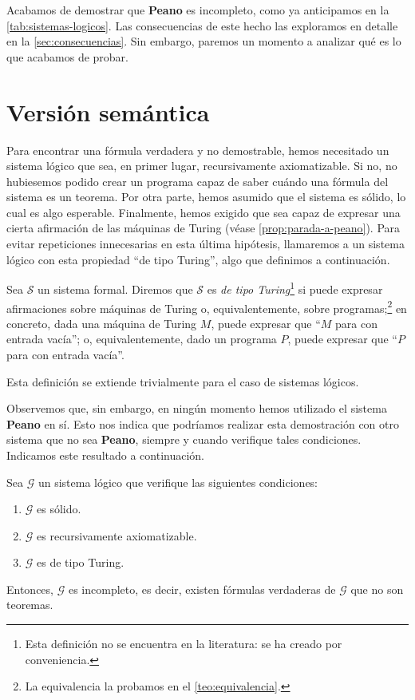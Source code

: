 Acabamos de demostrar que \textbf{Peano} es incompleto, como ya anticipamos en la \cref{tab:sistemas-logicos}. Las consecuencias de este hecho las exploramos en detalle en la \cref{sec:consecuencias}. Sin embargo, paremos un momento a analizar qué es lo que acabamos de probar.

\section{Versión semántica}\label{sec:version-semantica}

Para encontrar una fórmula verdadera y no demostrable, hemos necesitado un sistema lógico que sea, en primer lugar, recursivamente axiomatizable. Si no, no hubiesemos podido crear un programa capaz de saber cuándo una fórmula del sistema es un teorema. Por otra parte, hemos asumido que el sistema es sólido, lo cual es algo esperable. Finalmente, hemos exigido que sea capaz de expresar una cierta afirmación de las máquinas de Turing (véase \cref{prop:parada-a-peano}). Para evitar repeticiones innecesarias en esta última hipótesis, llamaremos a un sistema lógico con esta propiedad ``de tipo Turing'', algo que definimos a continuación.

\begin{definicion}
Sea $\mathcal{S}$ un sistema formal. Diremos que $\mathcal{S}$ es \emph{de tipo Turing}\footnote{Esta definición no se encuentra en la literatura: se ha creado por conveniencia.} si puede expresar afirmaciones sobre máquinas de Turing o, equivalentemente, sobre programas;\footnote{La equivalencia la probamos en el \cref{teo:equivalencia}.} en concreto, dada una máquina de Turing $M$, puede expresar que ``$M$ para con entrada vacía''; o, equivalentemente, dado un programa $P$, puede expresar que ``$P$ para con entrada vacía''.

Esta definición se extiende trivialmente para el caso de sistemas lógicos.
\end{definicion}

Observemos que, sin embargo, en ningún momento hemos utilizado el sistema \textbf{Peano} en sí. Esto nos indica que podríamos realizar esta demostración con otro sistema que no sea \textbf{Peano}, siempre y cuando verifique tales condiciones. Indicamos este resultado a continuación.

\begin{teorema}\label{teo:incompletitud-semantica}
Sea $\mathcal{G}$ un sistema lógico que verifique las siguientes condiciones:
\begin{enumerate}[label=(\arabic*)]
    \item $\mathcal{G}$ es sólido.
    \item $\mathcal{G}$ es recursivamente axiomatizable.
    \item $\mathcal{G}$ es de tipo Turing.
\end{enumerate}
Entonces, $\mathcal{G}$ es incompleto, es decir, existen fórmulas verdaderas de $\mathcal{G}$ que no son teoremas.
\end{teorema}

